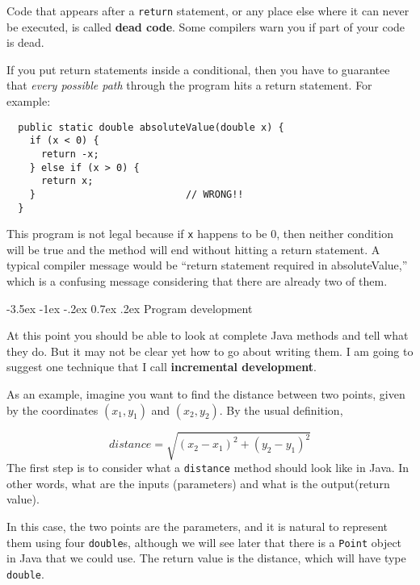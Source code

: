 \documentclass{book}
\makeatletter
\renewcommand{\section}{\@startsection 
    {section} {1} {0mm}%
    {-3.5ex \@plus -1ex \@minus -.2ex}%
    {0.7ex \@plus.2ex}%
    {\normalfont\Large\bfseries}}
\makeatother
\begin{document}
Code that appears after a {\tt return} statement, or any place else
where it can never be executed, is called {\bf dead code}.  Some
compilers warn you if part of your code is dead.


If you put return statements inside a conditional, then
you have to guarantee that {\em every possible path} through
the program hits a return statement.  For example:

\begin{verbatim}
  public static double absoluteValue(double x) {
    if (x < 0) {
      return -x;
    } else if (x > 0) {
      return x;
    }                          // WRONG!!
  }
\end{verbatim}
%
This program is not legal because if {\tt x} happens to be 0, then
neither condition will be true and the method will end without hitting
a return statement.  A typical compiler message would be ``return
statement required in absoluteValue,'' which is a confusing message
considering that there are already two of them.

\section{Program development}
\label{distance}

At this point you should be able to look at complete Java methods
and tell what they do.  But it may not be clear yet how to go
about writing them.  I am going to suggest one technique that
I call {\bf incremental development}.


As an example, imagine you want to find the distance between
two points, given by the coordinates $(x_1, y_1)$ and
$(x_2, y_2)$.  By the usual definition,

\begin{equation}
distance = \sqrt{(x_2 - x_1)^2 +(y_2 - y_1)^2}
\end{equation}
%
The first step is to consider what a {\tt distance} method
should look like in Java.  In other words, what are the inputs
(parameters) and what is the output(return value).

In this case, the two points are the parameters, and it is
natural to represent them using four {\tt double}s, although
we will see later that there is a {\tt Point} object in Java
that we could use.  The return value is the distance, which
will have type {\tt double}.
\end{document}
